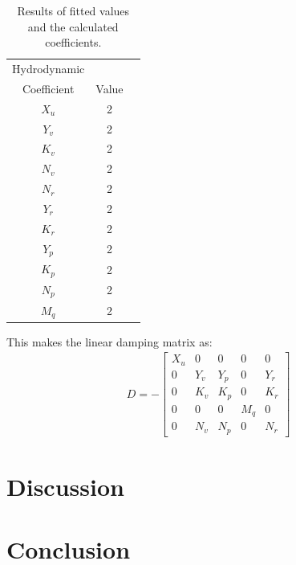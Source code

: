 \begin{table}[htbp]
\centering
\begin{tabular}{ccc}
	\toprule
  Hydrodynamic\\Coefficient & Value \\
  \midrule
  $X_u$ & 2 \\
  $Y_v$ & 2 \\
  $K_v$ & 2 \\
  $N_v$ & 2 \\
  $N_r$ & 2 \\
  $Y_r$ & 2 \\
  $K_r$ & 2 \\
  $Y_p$ & 2 \\
  $K_p$ & 2 \\
  $N_p$ & 2 \\
  $M_q$ & 2 \\
	\bottomrule
\end{tabular}
\caption{Results of fitted values and the calculated coefficients.}
\label{tab:dmatrix}
\end{table}
This makes the linear damping matrix as:
\begin{align}
D = -
\begin{bmatrix}
X_u & 0 & 0 & 0 & 0\\
0 & Y_v & Y_p & 0 & Y_r\\
0 & K_v & K_p & 0 & K_r\\
0 & 0 & 0 & M_q & 0\\
0 & N_v & N_p & 0 & N_r
\end{bmatrix}
\end{align}

\section{Discussion}


\section{Conclusion}

